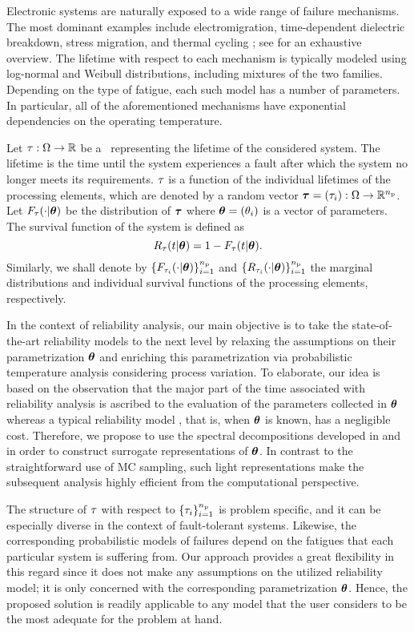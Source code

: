 Electronic systems are naturally exposed to a wide range of failure mechanisms.
The most dominant examples include electromigration, time-dependent dielectric breakdown, stress migration, and thermal cycling \cite{xiang2010}; see \cite{jedec2011} for an exhaustive overview.
The lifetime with respect to each mechanism is typically modeled using log-normal and Weibull distributions, including mixtures of the two families.
Depending on the type of fatigue, each such model has a number of parameters.
In particular, all of the aforementioned mechanisms have exponential dependencies on the operating temperature.

Let $\tau: \Omega \to \mathbb{R}$ be a \rv\ representing the lifetime of the considered system.
The lifetime is the time until the system experiences a fault after which the system no longer meets its requirements.
$\tau$ is a function of the individual lifetimes of the processing elements, which are denoted by a random vector $\bm{\tau} = (\tau_i): \Omega \to \mathbb{R}^{n_\text{p}}$.
Let $F_\tau(\cdot | \bm{\theta})$ be the distribution of $\bm{\tau}$ where $\bm{\theta} = (\theta_i)$ is a vector of parameters.
The survival function of the system is defined as
\[
  R_\tau(t | \bm{\theta}) = 1 - F_\tau(t | \bm{\theta}).
\]
Similarly, we shall denote by $\{ F_{\tau_i}(\cdot | \bm{\theta}) \}_{i = 1}^{n_\text{p}}$ and $\{ R_{\tau_i}(\cdot | \bm{\theta}) \}_{i = 1}^{n_\text{p}}$ the marginal distributions and individual survival functions of the processing elements, respectively.

In the context of reliability analysis, our main objective is to take the state-of-the-art reliability models to the next level by relaxing the assumptions on their parametrization $\bm{\theta}$ and enriching this parametrization via probabilistic temperature analysis considering process variation.
To elaborate, our idea is based on the observation that the major part of the time associated with reliability analysis is ascribed to the evaluation of the parameters collected in $\bm{\theta}$ whereas a typical reliability model \perse, that is, when $\bm{\theta}$ is known, has a negligible cost.
Therefore, we propose to use the spectral decompositions developed in  and  in order to construct surrogate representations of $\bm{\theta}$.
In contrast to the straightforward use of MC sampling, such light representations make the subsequent analysis highly efficient from the computational perspective.

The structure of $\tau$ with respect to $\{ \tau_i \}_{i = 1}^{n_\text{p}}$ is problem specific, and it can be especially diverse in the context of fault-tolerant systems.
Likewise, the corresponding probabilistic models of failures depend on the fatigues that each particular system is suffering from.
Our approach provides a great flexibility in this regard since it does not make any assumptions on the utilized reliability model; it is only concerned with the corresponding parametrization $\bm{\theta}$.
Hence, the proposed solution is readily applicable to any model that the user considers to be the most adequate for the problem at hand.

